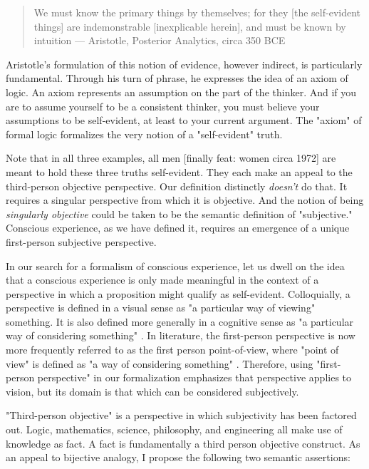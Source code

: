 \documentclass[runningheads]{llncs}
\begin{document}
\begin{quote}
We must know the primary things by themselves; for they [the self-evident things] are indemonstrable [inexplicable herein], and must be known by intuition --- Aristotle, Posterior Analytics, circa 350 BCE
\end{quote}

Aristotle's formulation of this notion of evidence, however indirect, is particularly fundamental. Through his turn of phrase, he expresses the idea of an axiom of logic. An axiom represents an assumption on the part of the thinker. And if you are to assume yourself to be a consistent thinker, you must believe your assumptions to be self-evident, at least to your current argument. The "axiom" of formal logic formalizes the very notion of a "self-evident" truth.

Note that in all three examples, all men [finally feat: women circa 1972] are meant to hold these three truths self-evident. They each make an appeal to the third-person objective perspective. Our definition distinctly \emph{doesn't} do that. It requires a singular perspective from which it is objective. And the notion of being \emph{singularly objective} could be taken to be the semantic definition of "subjective." Conscious experience, as we have defined it, requires an emergence of a unique first-person subjective perspective.

In our search for a formalism of conscious experience, let us dwell on the idea that a conscious experience is only made meaningful in the context of a perspective in which a proposition might qualify as self-evident. Colloquially, a perspective is defined in a visual sense as "a particular way of viewing" something. It is also defined more generally in a cognitive sense as "a particular way of considering something" \cite{DictionaryC}. In literature, the first-person perspective is now more frequently referred to as the first person point-of-view, where "point of view" is defined as "a way of considering something" \cite{DictionaryC}. Therefore, using "first-person perspective" in our formalization emphasizes that perspective applies to vision, but its domain is that which can be considered subjectively.

"Third-person objective" is a perspective in which subjectivity has been factored out. Logic, mathematics, science, philosophy, and engineering all make use of knowledge as fact. A fact is fundamentally a third person objective construct. As an appeal to bijective analogy, I propose the following two semantic assertions:
\end{document}
